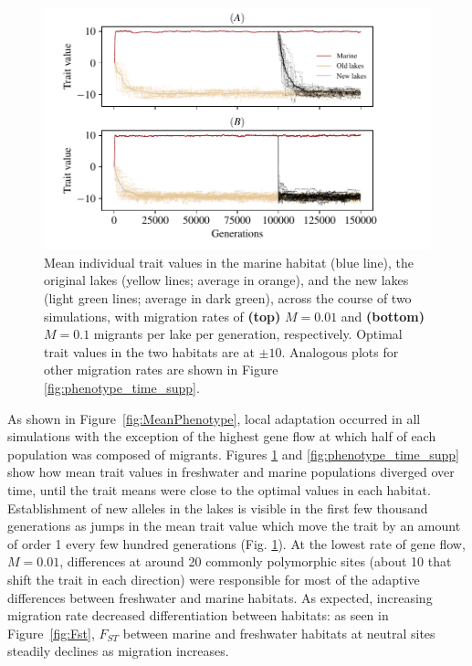 \documentclass{article}
\begin{document}
\begin{figure}
    \begin{center}
        \includegraphics{Final_Plots/Pheno_Time.pdf}
          \caption{ 
                Mean individual trait values in the marine habitat (blue line),
                the original lakes (yellow lines; average in orange),
                and the new lakes (light green lines; average in dark green),
                across the course of two simulations, with migration rates of
                \textbf{(top)} $M=0.01$ and
                \textbf{(bottom)} $M=0.1$ 
                migrants per lake per generation, respectively.
                Optimal trait values in the two habitats are at $\pm 10$.
                    Analogous plots for other migration rates
                    are shown in Figure \ref{fig:phenotype_time_supp}.
        }
          \label{fig:phenotype_time}
    \end{center}
\end{figure}

As shown in Figure~\ref{fig:MeanPhenotype}, local adaptation occurred in all simulations with the exception of the highest gene flow at which half of each population was composed of migrants. 
Figures \ref{fig:phenotype_time} and \ref{fig:phenotype_time_supp} show how mean trait values in freshwater and marine populations diverged over time, until the trait means were close to the optimal values in each habitat. 
Establishment of new alleles in the lakes is visible in the first few thousand generations as jumps in the mean trait value which move the trait by an amount of order 1 every few hundred generations (Fig. \ref{fig:phenotype_time}).
At the lowest rate of gene flow, $M = 0.01$, differences at around 20 commonly polymorphic sites (about 10 that shift the trait in each direction) were responsible for most of the adaptive differences between freshwater and marine habitats. 
As expected, increasing migration rate decreased differentiation between habitats: as seen in Figure~\ref{fig:Fst}, $F_{ST}$ between marine and freshwater habitats at neutral sites steadily declines as migration increases. 
\end{document}
